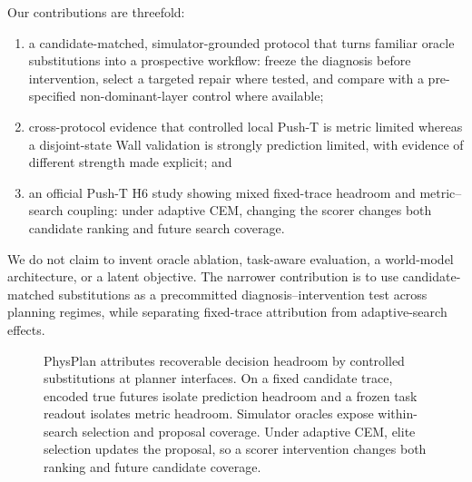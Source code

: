 Our contributions are threefold:
\begin{enumerate}
  \item a candidate-matched, simulator-grounded protocol that turns familiar oracle substitutions into a prospective workflow: freeze the diagnosis before intervention, select a targeted repair where tested, and compare with a pre-specified non-dominant-layer control where available;
  \item cross-protocol evidence that controlled local Push-T is metric limited whereas a disjoint-state Wall validation is strongly prediction limited, with evidence of different strength made explicit; and
  \item an official Push-T H6 study showing mixed fixed-trace headroom and metric--search coupling: under adaptive CEM, changing the scorer changes both candidate ranking and future search coverage.
\end{enumerate}
We do not claim to invent oracle ablation, task-aware evaluation, a world-model architecture, or a latent objective. The narrower contribution is to use candidate-matched substitutions as a precommitted diagnosis--intervention test across planning regimes, while separating fixed-trace attribution from adaptive-search effects.

\begin{figure}[t]
  \centering
  \resizebox{\textwidth}{!}{}
  \caption{PhysPlan attributes recoverable decision headroom by controlled substitutions at planner interfaces. On a fixed candidate trace, encoded true futures isolate prediction headroom and a frozen task readout isolates metric headroom. Simulator oracles expose within-search selection and proposal coverage. Under adaptive CEM, elite selection updates the proposal, so a scorer intervention changes both ranking and future candidate coverage.}
  \label{fig:pipeline}
\end{figure}
